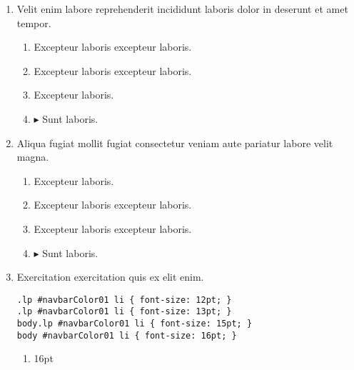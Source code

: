 \documentclass[a4paper,12pt]{article}
\begin{document}
\begin{enumerate}[label=\textbf{\arabic*.}]
\begin{multicols}{2}
\begin{enumerate}
		\item  Excepteur laboris.
    
		\item  Excepteur laboris excepteur laboris.
  
	\end{enumerate}

\end{multicols}
\item Velit enim labore reprehenderit incididunt laboris dolor in deserunt et amet tempor.
\begin{multicols}{2}
	\begin{enumerate}
		\item  Excepteur laboris excepteur laboris.
    
		\item  Excepteur laboris excepteur laboris.
  
		\item  Excepteur laboris.
    
		\item $\blacktriangleright$  Sunt laboris.
    
	\end{enumerate}

\end{multicols}
\item Aliqua fugiat mollit fugiat consectetur veniam aute pariatur labore velit magna.
\begin{multicols}{2}
	\begin{enumerate}
		\item  Excepteur laboris.
    
		\item  Excepteur laboris excepteur laboris.
    
		\item  Excepteur laboris excepteur laboris.
  
		\item $\blacktriangleright$  Sunt laboris.
    
	\end{enumerate}

\end{multicols}
\item Exercitation exercitation quis ex elit enim.
  
  \begin{minipage}{\textwidth} %
  \begin{lstlisting}
.lp #navbarColor01 li { font-size: 12pt; }
.lp #navbarColor01 li { font-size: 13pt; }
body.lp #navbarColor01 li { font-size: 15pt; }
body #navbarColor01 li { font-size: 16pt; }
  \end{lstlisting}
  \end{minipage}
\begin{multicols}{2}
	\begin{enumerate}
		\item  16pt
  

\end{enumerate}
\end{multicols}
\end{enumerate}
\end{document}

